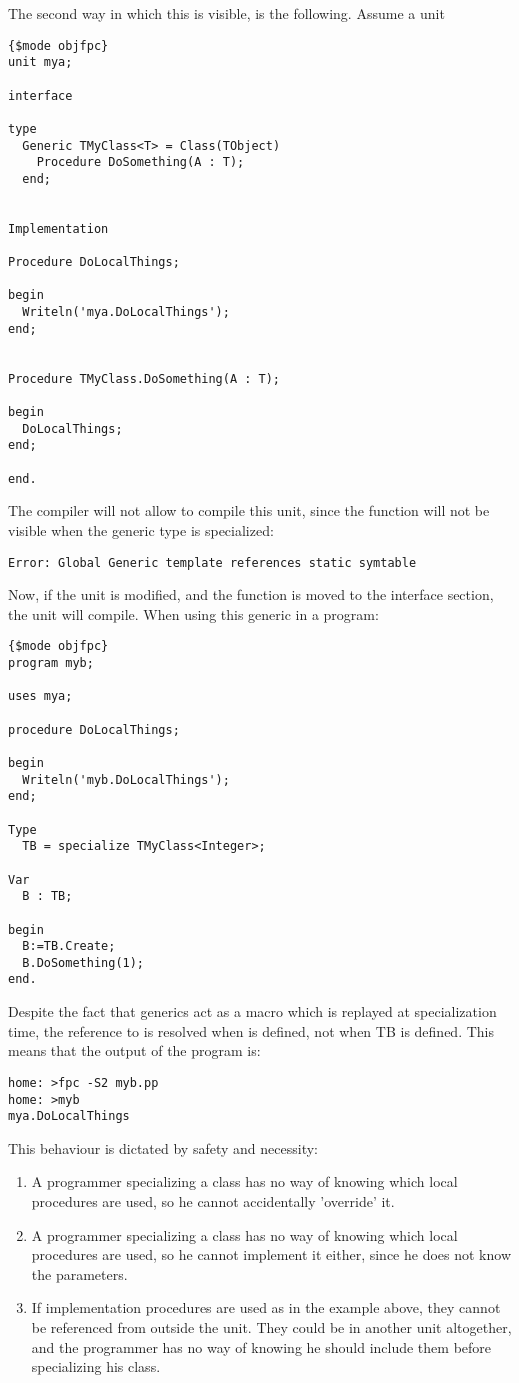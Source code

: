 The second way in which this is visible, is the following. Assume a unit
\begin{verbatim}
{$mode objfpc}
unit mya;

interface

type
  Generic TMyClass<T> = Class(TObject)
    Procedure DoSomething(A : T);
  end;


Implementation

Procedure DoLocalThings;

begin
  Writeln('mya.DoLocalThings');
end;


Procedure TMyClass.DoSomething(A : T);

begin
  DoLocalThings;
end;

end.
\end{verbatim}
The compiler will not allow to compile this unit, since the  function will not be visible when the generic type is specialized:
\begin{verbatim}
Error: Global Generic template references static symtable
\end{verbatim}
Now, if the unit is modified, and the  function  is moved to the interface section, the unit will compile.
When using this generic in a program:
\begin{verbatim}
{$mode objfpc}
program myb;

uses mya;

procedure DoLocalThings;

begin
  Writeln('myb.DoLocalThings');
end;

Type
  TB = specialize TMyClass<Integer>;

Var
  B : TB;

begin
  B:=TB.Create;
  B.DoSomething(1);
end.
\end{verbatim}
Despite the fact that generics act as a macro which is replayed at specialization time, the reference to  is resolved
when  is defined, not when TB is defined. This means that the output of the program is:
\begin{verbatim}
home: >fpc -S2 myb.pp
home: >myb
mya.DoLocalThings
\end{verbatim}
This behaviour is dictated by safety and necessity:
\begin{enumerate}
\item A programmer specializing a class has no way of knowing which local
procedures are used, so he cannot accidentally 'override' it.
\item A programmer specializing a class has no way of knowing which local
procedures are used, so he cannot implement it either, since he does not
know the parameters.
\item If implementation procedures are used as in the example above, they 
cannot be referenced from outside the unit. They could be in another unit
altogether, and the programmer has no way of knowing he should include them
before specializing his class.
\end{enumerate}

